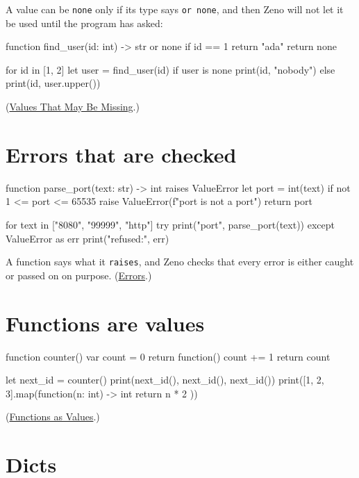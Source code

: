 A value can be \verb|none| only if its type says \verb|or none|, and
then Zeno will not let it be used until the program has asked:

\begin{zeno}
function find_user(id: int) -> str or none {
    if id == 1 {
        return "ada"
    }
    return none
}

for id in [1, 2] {
    let user = find_user(id)
    if user is none {
        print(id, "nobody")
    } else {
        print(id, user.upper())
    }
}
\end{zeno}

(\hyperref[ch-none]{Values That May Be Missing}.)

\section{Errors that are checked}

\begin{zeno}
function parse_port(text: str) -> int raises ValueError {
    let port = int(text)
    if not 1 <= port <= 65535 {
        raise ValueError(f"{port} is not a port")
    }
    return port
}

for text in ["8080", "99999", "http"] {
    try {
        print("port", parse_port(text))
    } except ValueError as err {
        print("refused:", err)
    }
}
\end{zeno}

A function says what it \verb|raises|, and Zeno checks that every error
is either caught or passed on on purpose. (\hyperref[ch-errors]{Errors}.)

\section{Functions are values}

\begin{zeno}
function counter() {
    var count = 0
    return function() {
        count += 1
        return count
    }
}

let next_id = counter()
print(next_id(), next_id(), next_id())
print([1, 2, 3].map(function(n: int) -> int { return n * 2 }))
\end{zeno}

(\hyperref[ch-function-values]{Functions as Values}.)

\section{Dicts}

